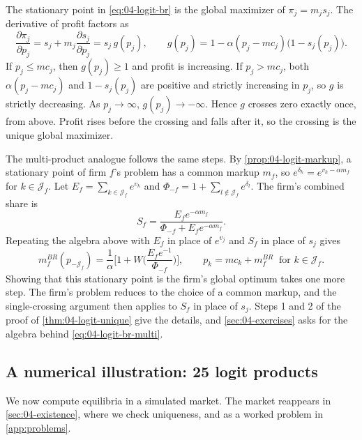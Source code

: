 The stationary point in \eqref{eq:04-logit-br} is the global maximizer of $\pi_j = m_js_j$. The derivative of
profit factors as
\begin{equation*}
\frac{\partial\pi_j}{\partial p_j} = s_j + m_j\frac{\partial s_j}{\partial p_j} = s_j\,g(p_j),
\qquad
g(p_j) = 1 - \alpha(p_j - mc_j)\big(1 - s_j(p_j)\big).
\end{equation*}
If $p_j \le mc_j$, then $g(p_j) \ge 1$ and profit is increasing. If $p_j > mc_j$, both $\alpha(p_j - mc_j)$ and
$1 - s_j(p_j)$ are positive and strictly increasing in $p_j$, so $g$ is strictly decreasing. As
$p_j \to \infty$, $g(p_j) \to -\infty$. Hence $g$ crosses zero exactly once, from above. Profit rises before the
crossing and falls after it, so the crossing is the unique global maximizer.

The multi-product analogue follows the same steps. By \cref{prop:04-logit-markup}, a stationary point of firm
$f$'s problem has a common markup $m_f$, so $e^{\delta_k} = e^{v_k - \alpha m_f}$ for $k \in \mathcal{J}_f$. Let
$E_f = \sum_{k \in \mathcal{J}_f}e^{v_k}$ and $\Phi_{-f} = 1 + \sum_{l \notin \mathcal{J}_f}e^{\delta_l}$. The
firm's combined share is
\begin{equation*}
S_f = \frac{E_fe^{-\alpha m_f}}{\Phi_{-f} + E_fe^{-\alpha m_f}}.
\end{equation*}
Repeating the algebra above with $E_f$ in place of $e^{v_j}$ and $S_f$ in place of $s_j$ gives
\begin{equation}\label{eq:04-logit-br-multi}
m_f^{BR}(p_{-\mathcal{J}_f}) = \frac{1}{\alpha}\Big[1 + W\Big(\frac{E_fe^{-1}}{\Phi_{-f}}\Big)\Big],
\qquad
p_k = mc_k + m_f^{BR} \ \text{ for } k \in \mathcal{J}_f.
\end{equation}
Showing that this stationary point is the firm's global optimum takes one more step. The firm's problem reduces to
the choice of a common markup, and the single-crossing argument then applies to $S_f$ in place of $s_j$. Steps 1
and 2 of the proof of \cref{thm:04-logit-unique} give the details, and \cref{sec:04-exercises} asks for the
algebra behind \eqref{eq:04-logit-br-multi}.

\subsection{A numerical illustration: 25 logit products}\label{sec:04-bertrand-logit25}

We now compute equilibria in a simulated market. The market reappears in \cref{sec:04-existence}, where we check
uniqueness, and as a worked problem in \cref{app:problems}.

